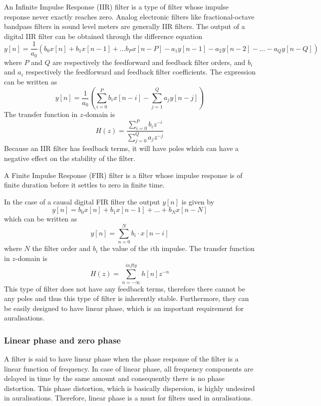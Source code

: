 An Infinite Impulse Response (IIR) filter is a type of filter whose impulse response never exactly reaches zero. Analog electronic filters like fractional-octave bandpass filters in sound level meters are generally IIR filters.
The output of a digital IIR filter can be obtained through the difference equation
\begin{equation}
 y[n] = \frac{1}{a_0} \left( b_0 x[n] + b_1 x[n-1] + \dots b_P x[n-P] - a_1 y[n-1] - a_2 y[n-2] - \dots - a_Q y[n-Q]\right)
\end{equation}
where $P$ and $Q$ are respectively the feedforward and feedback filter orders, and $b_i$ and $a_i$ respectively the feedforward and feedback filter coefficients.
The expression can be written as
\begin{equation}
 y[n] = \frac{1}{a_0} \left( \sum_{i=0}^{P} b_i x[n-i] - \sum_{j=1}^Q a_j y[n-j] \right)
\end{equation}
The transfer function in $z$-domain is
\begin{equation}
 H(z) = \frac{\sum_{i=0}^P b_i z^{-i}}{\sum_{j=0}^Q a_j z^{-j}}
\end{equation}
Because an IIR filter has feedback terms, it will have poles which can have a negative effect on the stability of the filter.

A Finite Impulse Response (FIR) filter is a filter whose impulse response is of finite duration before it settles to zero in finite time.

In the case of a causal digital FIR filter the output $y[n]$ is given by
\begin{equation}
 y[n] = b_0 x[n] + b_1 x[n-1] + \dots + b_N x[n-N]
\end{equation}
which can be written as
\begin{equation}
 y[n] = \sum_{n=0}^{N} b_i \cdot x[n-i]
\end{equation}
where $N$ the filter order and $b_i$ the value of the $i$th impulse.
The transfer function in $z$-domain is
\begin{equation}
H(z) = \sum_{n=-\infty}^{infty} h[n] z^{-n}
\end{equation}
This type of filter does not have any feedback terms, therefore there cannot be any poles and thus this type of filter is inherently stable.
Furthermore, they can be easily designed to have linear phase, which is an important requirement for auralisations.

\subsubsection{Linear phase and zero phase}\label{sec:theory:signal-processing:linear-phase}
A filter is said to have linear phase when the phase response of the filter is a 
linear function of frequency. In case of linear phase, all frequency components 
are delayed in time by the same amount and consequently there is no phase 
distortion. This phase distortion, which is basically dispersion, is highly 
undesired in auralisations. Therefore, linear phase is a must for filters used 
in auralisations.


